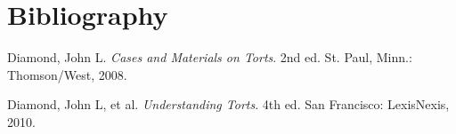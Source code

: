 \section{Bibliography}

Diamond, John L. \emph{Cases and Materials on Torts}. 2nd ed. St. Paul, Minn.: Thomson/West, 2008.

Diamond, John L, et al. \emph{Understanding Torts}. 4th ed. San Francisco: LexisNexis, 2010.
